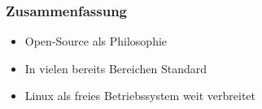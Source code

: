 \begin{frame}
	\frametitle{Zusammenfassung}
	\begin{itemize}
		\item Open-Source als Philosophie
		\item In vielen bereits Bereichen Standard
		\item Linux als freies Betriebssystem weit verbreitet
	\end{itemize}
\end{frame}

 






 






